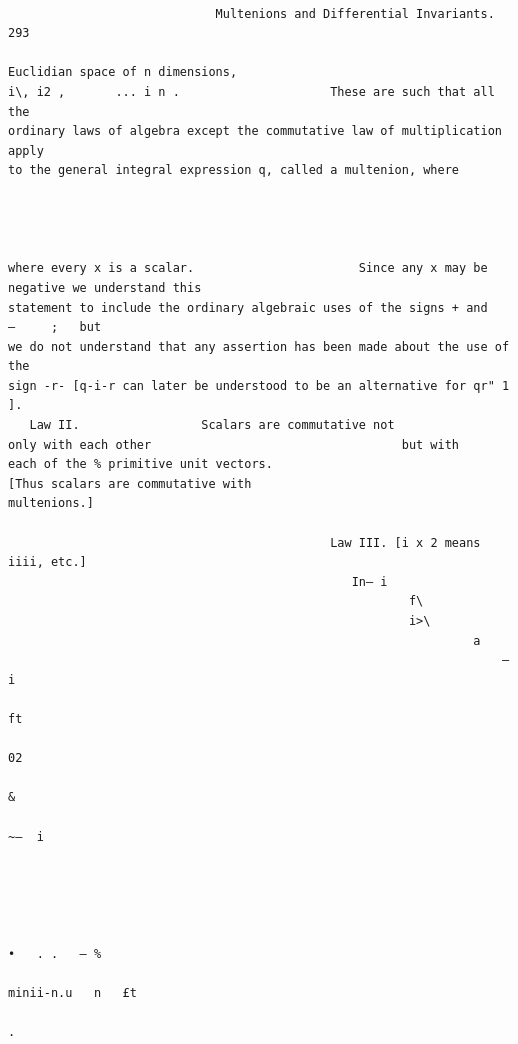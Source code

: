 \documentclass[10pt]{article}
\begin{document}
\clearpage
\begin{verbatim}

                             Multenions and Differential Invariants.                                                                                               293

Euclidian space of n dimensions,                                     i\, i2 ,       ... i n .                     These are such that all the
ordinary laws of algebra except the commutative law of multiplication apply
to the general integral expression q, called a multenion, where




where every x is a scalar.                       Since any x may be negative we understand this
statement to include the ordinary algebraic uses of the signs + and                                                                                      —     ;   but
we do not understand that any assertion has been made about the use of the
sign -r- [q-i-r can later be understood to be an alternative for qr" 1 ].
   Law II.                 Scalars are commutative not                                          only with each other                                   but with
each of the % primitive unit vectors.                                               [Thus scalars are commutative with
multenions.]

                                             Law III. [i x 2 means iiii, etc.]
                                                In— i
                                                        f\
                                                        i>\
                                                                 a
                                                                     — i
                                                                           ft
                                                                           02
                                                                                &
                                                                                    ~—  i




                                                                                                •   . .   — %
                                                                                                          minii-n.u   n   £t
                                                                                                                               .





\end{verbatim}
\end{document}
